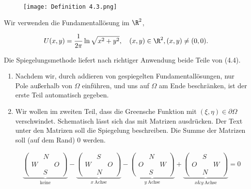 \begin{solution}

\phantom{}

\begin{figure}[h!]
  \centering
  \texttt{[image: Definition 4.3.png]}
\end{figure}


Wir verwenden die Fundamentallösung im $\R^2$,

\begin{align*}
  U(x, y)
  =
  \frac{1}{2 \pi}
  \ln \sqrt{x^2 + y^2},
  \quad
  (x, y) \in \R^2,
  (x, y) \neq (0, 0).
\end{align*}

Die Spiegelungsmethode liefert nach richtiger Anwendung beide Teile von (4.4).

\begin{enumerate}
  
  \item Nachdem wir, durch addieren von gespiegelten Fundamentallösungen, nur Pole außerhalb von $\Omega$ einführen, und uns auf $\Omega$ am Ende beschränken, ist der erste Teil automatisch gegeben.

  \item Wir wollen im zweiten Teil, dass die Greensche Funktion mit $(\xi, \eta) \in \partial \Omega$ verschwindet.
  Schematisch lässt sich das mit Matrizen ausdrücken.
  Der Text unter den Matrizen soll die Spiegelung beschreiben.
  Die Summe der Matrizen soll (auf dem Rand) $0$ werden.
  
  \begin{align*}
    \underbrace
    {
      \begin{pmatrix}
          & N &   \\
        W &   & O \\
          & S &  
      \end{pmatrix}
    }_{
      \text{keine}
    }
    -
    \underbrace
    {
      \begin{pmatrix}
          & S &   \\
        W &   & O \\
          & N &  
      \end{pmatrix}
    }_{
      x ~\text{Achse}
    }
    -
    \underbrace
    {
      \begin{pmatrix}
          & N &   \\
        O &   & W \\
          & S &  
      \end{pmatrix}
    }_{
      y ~\text{Achse}
    }
    +
    \underbrace
    {
      \begin{pmatrix}
          & S &   \\
        O &   & W \\
          & N &  
      \end{pmatrix}
    }_{
      x \& y ~\text{Achse}
    }
    =
    0
  \end{align*}


\end{enumerate}
\end{solution}
